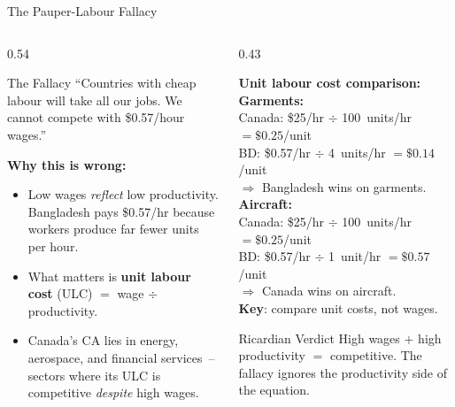 \documentclass[aspectratio=169]{beamer}
\begin{document}
\begin{frame}{The Pauper-Labour Fallacy}
\begin{columns}[T]
\begin{column}{0.54\textwidth}
\begin{alertblock}{The Fallacy}
\small ``Countries with cheap labour will take all our
jobs.  We cannot compete with \$0.57/hour wages.''
\end{alertblock}
\vspace{0.25em}
\textbf{Why this is wrong:}
\begin{itemize}\small
  \item Low wages \emph{reflect} low productivity.
        Bangladesh pays \$0.57/hr because workers produce
        far fewer units per hour.
  \item What matters is \textbf{unit labour cost}
        (ULC) $=$ wage $\div$ productivity.
  \item Canada's CA lies in energy, aerospace, and
        financial services~-- sectors where its ULC is
        competitive \emph{despite} high wages.
\end{itemize}
\end{column}
\begin{column}{0.43\textwidth}
\begin{varbox}
\footnotesize\textbf{Unit labour cost comparison:}\\[0.25em]
\textbf{Garments:}\\
Canada: \$25/hr $\div$ 100~units/hr $= \$0.25$/unit\\
BD: \$0.57/hr $\div$ 4~units/hr $= \$0.14$/unit\\
$\Rightarrow$ Bangladesh wins on garments.\\[0.3em]
\textbf{Aircraft:}\\
Canada: \$25/hr $\div$ 100~units/hr $= \$0.25$/unit\\
BD: \$0.57/hr $\div$ 1~unit/hr $= \$0.57$/unit\\
$\Rightarrow$ Canada wins on aircraft.\\[0.2em]
\textbf{Key}: compare unit costs, not wages.
\end{varbox}
\vspace{0.25em}
\begin{insight}{Ricardian Verdict}
\footnotesize High wages $+$ high productivity
$=$ competitive.  The fallacy ignores the
productivity side of the equation.
\end{insight}
\end{column}
\end{columns}
\end{frame}
\end{document}
